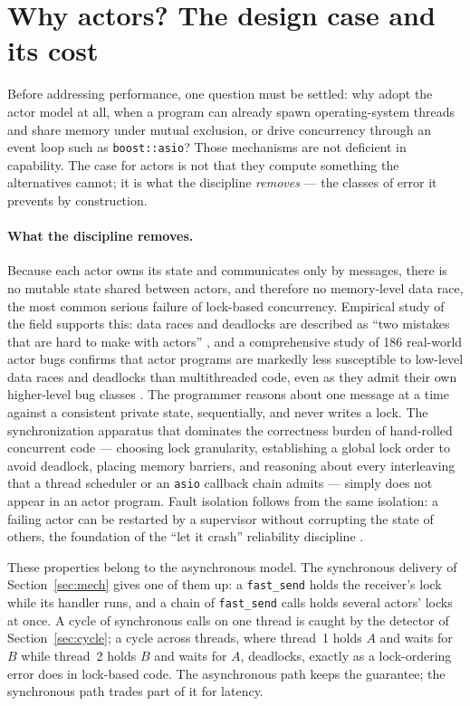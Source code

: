\documentclass[11pt]{article}
\newcommand{\fs}{\texttt{fast\_send}}
\begin{document}
\section{Why actors? The design case and its cost}
\label{sec:benefits}

Before addressing performance, one question must be settled: why adopt the
actor model at all, when a program can already spawn operating-system threads
and share memory under mutual exclusion, or drive concurrency through an event
loop such as \texttt{boost::asio}? Those mechanisms are not deficient in
capability. The case for actors is not that they compute something the
alternatives cannot; it is what the discipline \emph{removes} --- the classes
of error it prevents by construction.

\paragraph{What the discipline removes.} Because each actor owns its state and
communicates only by messages, there is no mutable state shared between actors,
and therefore no memory-level data race, the most common serious
failure of lock-based concurrency. Empirical study of the field supports this:
data races and deadlocks are described as ``two mistakes that are hard to make
with actors'' \cite{tasharofi2013}, and a comprehensive study of 186 real-world
actor bugs confirms that actor programs are markedly less susceptible to
low-level data races and deadlocks than multithreaded code, even as they admit
their own higher-level bug classes \cite{bagherzadeh2020,torreslopez2018}. The
programmer reasons about one message at a time against a consistent private
state, sequentially, and never writes a lock. The synchronization apparatus that
dominates the correctness burden of hand-rolled concurrent code --- choosing
lock granularity, establishing a global lock order to avoid deadlock, placing
memory barriers, and reasoning about every interleaving that a thread scheduler
or an \texttt{asio} callback chain admits --- simply does not appear in an actor
program. Fault isolation follows from the same isolation: a failing actor can be
restarted by a supervisor without corrupting the state of others, the
foundation of the ``let it crash'' reliability discipline \cite{armstrong2003}.

These properties belong to the asynchronous model. The synchronous delivery of
Section~\ref{sec:mech} gives one of them up: a \fs{} holds the receiver's lock
while its handler runs, and a chain of \fs{} calls holds several actors' locks at
once. A cycle of synchronous calls on one thread is caught by the detector of
Section~\ref{sec:cycle}; a cycle across threads, where thread~1 holds $A$ and
waits for $B$ while thread~2 holds $B$ and waits for $A$, deadlocks, exactly as a
lock-ordering error does in lock-based code. The asynchronous path keeps the
guarantee; the synchronous path trades part of it for latency.
\end{document}
